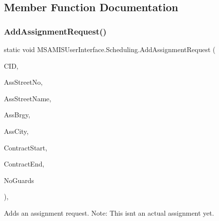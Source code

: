\subsection{Member Function Documentation}
\mbox{\label{class_m_s_a_m_i_s_user_interface_1_1_scheduling_a4f78423c6f2046dde0c077c0843360cd}} 
\subsubsection{\texorpdfstring{Add\+Assignment\+Request()}{AddAssignmentRequest()}}
{\footnotesize\ttfamily static void M\+S\+A\+M\+I\+S\+User\+Interface.\+Scheduling.\+Add\+Assignment\+Request (\begin{DoxyParamCaption}\item[{int}]{C\+ID,  }\item[{string}]{Ass\+Street\+No,  }\item[{string}]{Ass\+Street\+Name,  }\item[{string}]{Ass\+Brgy,  }\item[{string}]{Ass\+City,  }\item[{Date\+Time}]{Contract\+Start,  }\item[{Date\+Time}]{Contract\+End,  }\item[{int}]{No\+Guards }\end{DoxyParamCaption})\hspace{0.3cm}{\ttfamily [inline]}, {\ttfamily [static]}}



Adds an assignment request. Note\+: This isn\textquotesingle{}t an actual assignment yet. 


